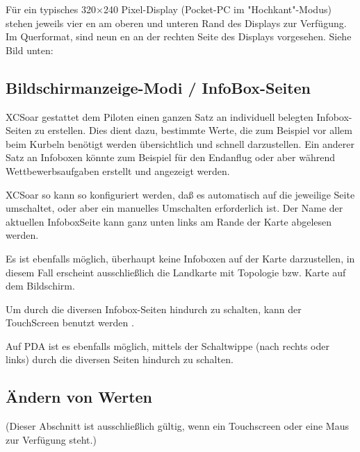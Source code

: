 Für ein typisches 320$\times$240 Pixel-Display (Pocket-\textsf{PC} im "Hochkant"-Modus) stehen jeweils vier {\InfoBox}en am oberen und unteren Rand des Displays zur Verfügung. 
Im Querformat, sind neun {\InfoBox}en an der rechten Seite des Displays vorgesehen. Siehe Bild unten:



\subsection*{Bildschirmanzeige-Modi / InfoBox-Seiten}

\textsf{XCSoar} gestattet dem Piloten einen ganzen Satz an individuell belegten Infobox-Seiten zu erstellen.
Dies dient dazu, bestimmte Werte, die zum Beispiel vor allem beim Kurbeln  benötigt werden übersichtlich und schnell darzustellen.
Ein anderer Satz an Infoboxen könnte zum Beispiel für den Endanflug oder aber während Wettbewerbsaufgaben erstellt und angezeigt werden.

\textsf{XCSoar} so kann so konfiguriert werden, daß es automatisch auf die jeweilige Seite umschaltet, oder aber ein manuelles Umschalten erforderlich ist. Der Name der aktuellen InfoboxSeite kann ganz unten links am Rande der Karte abgelesen werden.

Es ist ebenfalls möglich, überhaupt keine Infoboxen auf der Karte darzustellen, in diesem Fall erscheint ausschließlich die Landkarte mit Topologie bzw. Karte auf dem Bildschirm.

Um durch die diversen Infobox-Seiten hindurch zu schalten, kann der TouchScreen benutzt werden
. 

Auf PDA ist es ebenfalls möglich,  mittels der Schaltwippe  (nach rechts oder links) durch die diversen Seiten hindurch zu schalten.

\subsection*{Ändern von  {\InfoBox} Werten}
(Dieser Abschnitt ist ausschließlich gültig, wenn ein Touchscreen oder eine Maus zur Verfügung steht.)

